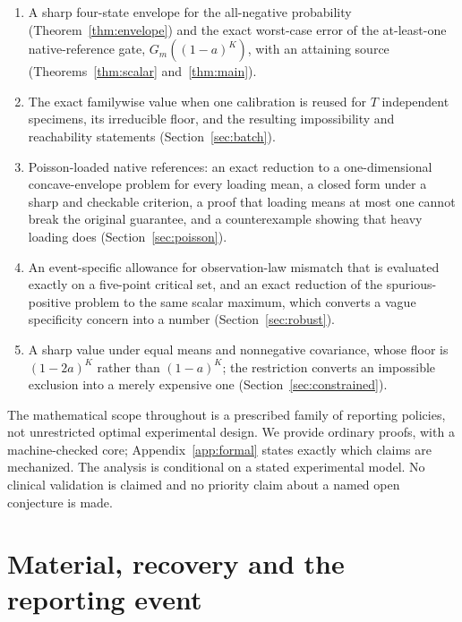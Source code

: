 \documentclass[11pt]{article}
\theoremstyle{remark}\newtheorem{remark}[theorem]{Remark}
\begin{document}
\begin{enumerate}\itemsep2pt
\item A sharp four-state envelope for the all-negative probability
  (Theorem~\ref{thm:envelope}) and the exact worst-case error of the
  at-least-one native-reference gate, $G_m((1-a)^K)$, with an attaining source
  (Theorems~\ref{thm:scalar} and~\ref{thm:main}).
\item The exact familywise value when one calibration is reused for $T$
  independent specimens, its irreducible floor, and the resulting impossibility
  and reachability statements (Section~\ref{sec:batch}).
\item Poisson-loaded native references: an exact reduction to a one-dimensional
  concave-envelope problem for every loading mean, a closed form under a sharp
  and checkable criterion, a proof that loading means at most one cannot break
  the original guarantee, and a counterexample showing that heavy loading does
  (Section~\ref{sec:poisson}).
\item An event-specific allowance for observation-law mismatch that is
  evaluated exactly on a five-point critical set, and an exact reduction of the
  spurious-positive problem to the same scalar maximum, which converts a vague
  specificity concern into a number (Section~\ref{sec:robust}).
\item A sharp value under equal means and nonnegative covariance, whose floor is
  $(1-2a)^K$ rather than $(1-a)^K$; the restriction converts an impossible
  exclusion into a merely expensive one (Section~\ref{sec:constrained}).
\end{enumerate}

The mathematical scope throughout is a prescribed family of reporting policies,
not unrestricted optimal experimental design. We provide ordinary proofs, with a
machine-checked core; Appendix~\ref{app:formal} states exactly which claims are
mechanized. The analysis is conditional on a stated experimental model. No
clinical validation is claimed and no priority claim about a named open
conjecture is made.

\section{Material, recovery and the reporting event}\label{sec:model}
\end{document}
